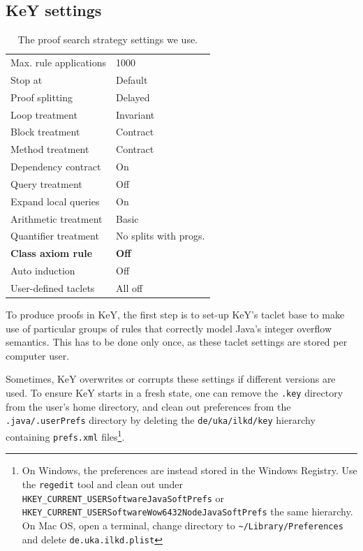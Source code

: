 \documentclass[runningheads]{llncs}
\def\bs{\char092}
\begin{document}
\subsection{KeY settings}

\begin{table}
    \begin{tabular}{l@{\hskip6pt}|@{\hskip6pt}l}
    Max. rule applications & 1000 \\
    Stop at & Default \\
    Proof splitting & Delayed \\
    Loop treatment & Invariant \\
    Block treatment & Contract \\
    Method treatment & Contract \\
    Dependency contract & On \\
    Query treatment & Off \\
    Expand local queries & On \\
    Arithmetic treatment & Basic \\
    Quantifier treatment & No splits with progs. \\
    \textbf{Class axiom rule} & \textbf{Off} \\
    Auto induction & Off \\
    User-defined taclets & All off
    \end{tabular}
    \medskip
    \caption{The proof search strategy settings we use.}
    \vspace*{-20pt}
    \label{tab:proof-strategy}
\end{table}

To produce proofs in KeY, the first step is to set-up KeY's taclet base to make use of particular groups of rules that correctly model Java's integer overflow semantics. This has to be done only once, as these taclet settings are stored per computer user.

Sometimes, KeY overwrites or corrupts these settings if different versions are used. To ensure KeY starts in a fresh state, one can remove the \texttt{.key} directory from the user's home directory, and clean out preferences from the \texttt{.java/.userPrefs} directory by deleting the \texttt{de/uka/ilkd/key} hierarchy containing \texttt{prefs.xml} files\footnote{On Windows, the preferences are instead stored in the Windows Registry. Use the \texttt{regedit} tool and clean out under \texttt{HKEY\_CURRENT\_USER\bs Software\bs JavaSoft\bs Prefs} or \texttt{HKEY\_CURRENT\_USER\bs Software\bs Wow6432Node\bs JavaSoft\bs Prefs} the same hierarchy. On Mac OS, open a terminal, change directory to \texttt{\textasciitilde/Library/Preferences} and delete \texttt{de.uka.ilkd.plist}}.
\end{document}
